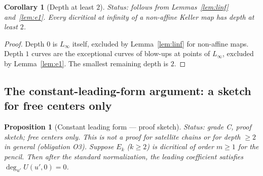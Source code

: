 \documentclass[a4paper,11pt]{article}
\theoremstyle{plain}
\newtheorem{proposition}[theorem]{Proposition}
\newtheorem{corollary}[theorem]{Corollary}
\theoremstyle{definition}
\theoremstyle{remark}
\begin{document}
\begin{corollary}[Depth at least $2$]\label{cor:depth2}
\textit{Status: follows from Lemmas~\ref{lem:linf} and~\ref{lem:e1}.}
Every dicritical at infinity of a non-affine Keller map has depth at least $2$.
\end{corollary}

\begin{proof}
Depth $0$ is $L_\infty$ itself, excluded by Lemma~\ref{lem:linf} for non-affine maps.
Depth $1$ curves are the exceptional curves of blow-ups at points of $L_\infty$, excluded by
Lemma~\ref{lem:e1}. The smallest remaining depth is $2$.
\end{proof}

\subsection{The constant-leading-form argument: a sketch for free centers only}\label{sec:constant-form}

\begin{proposition}[Constant leading form --- proof sketch]\label{prop:constant-form}
\textit{Status: grade C, proof sketch; free centers only. This is not a proof for satellite
chains or for depth $\geq 2$ in general (obligation O3).}
Suppose $E_k$ ($k \geq 2$) is dicritical of order $m \geq 1$ for the pencil. Then after the
standard normalization, the leading coefficient satisfies $\deg_{u'} U(u',0) = 0$.
\end{proposition}
\end{document}

